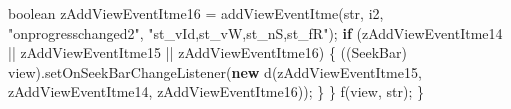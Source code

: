 \documentclass[
]{article}
\newenvironment{Shaded}{}{}
\newcommand{\ControlFlowTok}[1]{\textcolor[rgb]{0.00,0.44,0.13}{\textbf{#1}}}
\newcommand{\DataTypeTok}[1]{\textcolor[rgb]{0.56,0.13,0.00}{#1}}
\newcommand{\FunctionTok}[1]{\textcolor[rgb]{0.02,0.16,0.49}{#1}}
\newcommand{\KeywordTok}[1]{\textcolor[rgb]{0.00,0.44,0.13}{\textbf{#1}}}
\newcommand{\NormalTok}[1]{#1}
\newcommand{\OperatorTok}[1]{\textcolor[rgb]{0.40,0.40,0.40}{#1}}
\newcommand{\StringTok}[1]{\textcolor[rgb]{0.25,0.44,0.63}{#1}}
\begin{document}
\begin{Shaded}
\begin{Highlighting}[]
            \DataTypeTok{boolean}\NormalTok{ zAddViewEventItme16 }\OperatorTok{=} \FunctionTok{addViewEventItme}\OperatorTok{(}\NormalTok{str}\OperatorTok{,}\NormalTok{ i2}\OperatorTok{,} \StringTok{"onprogresschanged2"}\OperatorTok{,} \StringTok{"st\_vId,st\_vW,st\_nS,st\_fR"}\OperatorTok{);}
            \ControlFlowTok{if} \OperatorTok{(}\NormalTok{zAddViewEventItme14 }\OperatorTok{||}\NormalTok{ zAddViewEventItme15 }\OperatorTok{||}\NormalTok{ zAddViewEventItme16}\OperatorTok{)} \OperatorTok{\{}
                \OperatorTok{((}\NormalTok{SeekBar}\OperatorTok{)}\NormalTok{ view}\OperatorTok{).}\FunctionTok{setOnSeekBarChangeListener}\OperatorTok{(}\KeywordTok{new} \FunctionTok{d}\OperatorTok{(}\NormalTok{zAddViewEventItme15}\OperatorTok{,}\NormalTok{ zAddViewEventItme14}\OperatorTok{,}\NormalTok{ zAddViewEventItme16}\OperatorTok{));}
            \OperatorTok{\}}
        \OperatorTok{\}}
        \FunctionTok{f}\OperatorTok{(}\NormalTok{view}\OperatorTok{,}\NormalTok{ str}\OperatorTok{);}
    \OperatorTok{\}}


\end{Highlighting}
\end{Shaded}
\end{document}
